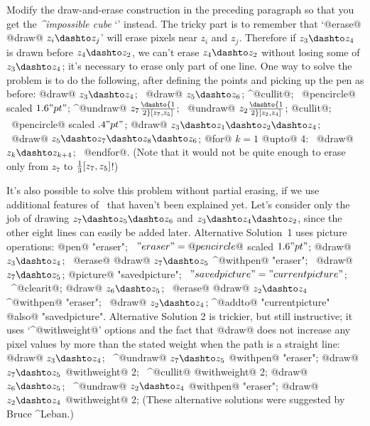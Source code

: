 {{{{\dangerexercise Modify the draw-and-erase construction in the preceding
paragraph so that you get the {\sl^{impossible cube}\/}
`\thinspace{\manual\cubeb}\thinspace' instead.
\answer The tricky part is to remember that `@erase@ @draw@ $z_i\dashto z_j$'
will erase pixels near $z_i$ and $z_j$. Therefore if $z_3\dashto z_4$ is
drawn before $z_4\dashto z_2$, we can't erase $z_4\dashto z_2$ without losing
some of $z_3\dashto z_4$; it's necessary to erase only part of one line.
One way to solve the problem is to do the following, after defining the
points and picking up the pen as before:
\begindisplay
@draw@ $z_3\dashto z_4$; \ @draw@ $z_5\dashto z_6$;\cr
^@cullit@; \ \pickup @pencircle@ scaled $1.6"pt"$;\cr
^@undraw@ $z_7\dashto {1\over2}[z_7,z_5]$; \
 @undraw@ $z_2\dashto {1\over2}[z_2,z_4]$;\cr
@cullit@; \ \pickup @pencircle@ scaled $.4"pt"$;\cr
@draw@ $z_3\dashto z_1\dashto z_2\dashto z_4$; \
 @draw@ $z_5\dashto z_7\dashto z_8\dashto z_6$;\cr
@for@ $k=1$ @upto@ 4: \ @draw@ $z_k\dashto z_{k+4}$; \ @endfor@.\cr
\enddisplay
(Note that it would not be quite enough to erase only from $z_7$ to
${1\over3}[z_7,z_5]$!)\par
It's also possible to solve this problem without partial erasing, if we
use additional features of \MF\ that haven't been explained yet. Let's
consider only the job of drawing $z_7\dashto z_5\dashto z_6$ and
$z_3\dashto z_4\dashto z_2$, since the other eight lines can easily be
added later. Alternative Solution~1 uses picture operations:
\begindisplay
@pen@ "eraser"; \ $"eraser"=@pencircle@$ scaled $1.6"pt"$;\cr
@draw@ $z_3\dashto z_4$; \
@erase@ @draw@ $z_7\dashto z_5$ ^@withpen@ "eraser"; \
@draw@ $z_7\dashto z_5$;\cr
@picture@ "savedpicture"; \ $"savedpicture"="currentpicture"$; \ ^@clearit@;\cr
@draw@ $z_6\dashto z_5$; \
@erase@ @draw@ $z_2\dashto z_4$ ^@withpen@ "eraser"; \
@draw@ $z_2\dashto z_4$;\cr
^@addto@ "currentpicture" @also@ "savedpicture".\cr
\enddisplay
Alternative Solution 2 is trickier, but still instructive; it uses
`^@withweight@' options and the fact that @draw@ does not increase any
pixel values by more than the stated weight when the path is a straight
line:
\begindisplay
@draw@ $z_3\dashto z_4$; \
^@undraw@ $z_7\dashto z_5$ @withpen@ "eraser";\cr
@draw@ $z_7\dashto z_5$ @withweight@ 2; \
^@cullit@ @withweight@ 2;\cr
@draw@ $z_6\dashto z_5$; \
^@undraw@ $z_2\dashto z_4$ @withpen@ "eraser";\cr
@draw@ $z_2\dashto z_4$ @withweight@ 2;\cr
\enddisplay
(These alternative solutions were suggested by Bruce ^{Leban}.)

}}}}
